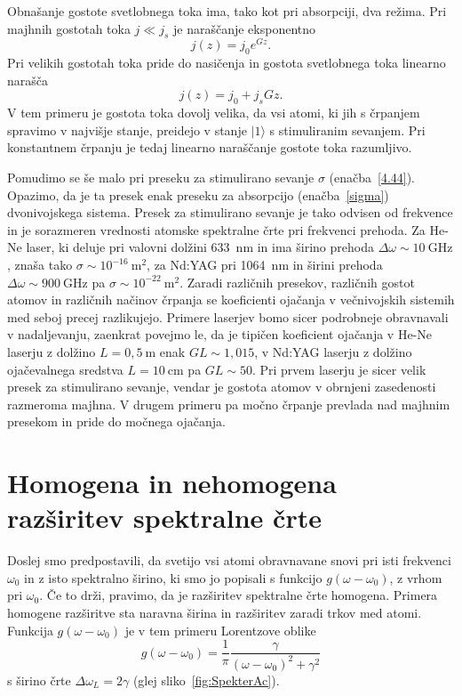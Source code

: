 Obnašanje gostote svetlobnega toka ima, tako kot pri absorpciji, dva režima. 
Pri majhnih gostotah toka $j\ll j_{s}$ je naraščanje eksponentno 
\begin{equation}
j(z)=j_{0}e^{Gz}.
\label{4.45}
\end{equation}
Pri velikih gostotah toka pride do nasičenja in gostota svetlobnega
toka linearno narašča
\begin{equation}
j(z)=j_{0}+j_{s}Gz.
\label{4.46}
\end{equation}
 V tem primeru je gostota toka dovolj velika, da vsi atomi, ki jih
s črpanjem spravimo v najvišje stanje, preidejo v stanje $|1\rangle$
s stimuliranim sevanjem. Pri konstantnem črpanju je tedaj 
linearno naraščanje gostote toka razumljivo. 

Pomudimo se še malo pri preseku za stimulirano sevanje $\sigma$
 (enačba~\ref{4.44}). Opazimo, da je ta presek enak preseku za
absorpcijo (enačba~\ref{sigma}) dvonivojskega sistema. Presek za stimulirano
sevanje je tako odvisen od frekvence in je sorazmeren vrednosti atomske spektralne 
črte pri frekvenci prehoda. Za He-Ne laser, 
ki deluje pri valovni dolžini 633~nm in ima 
širino prehoda $\Delta \omega \sim 10~\si{\giga\hertz}$, znaša tako  $\sigma \sim 10^{-16}~\si{\metre}^2$, 
za Nd:YAG pri 1064~nm in širini prehoda 
$\Delta \omega \sim 900~\si{\giga\hertz}$ pa  $\sigma \sim 10^{-22}~\si{\metre}^2$.
Zaradi različnih presekov, različnih gostot atomov in različnih načinov črpanja se 
koeficienti ojačanja v večnivojskih sistemih med seboj precej razlikujejo. Primere 
laserjev bomo sicer podrobneje obravnavali v nadaljevanju, zaenkrat povejmo 
le, da je tipičen koeficient ojačanja v He-Ne laserju z dolžino $L = 0,5~\si{\metre}$
enak $GL \sim 1,015$, v Nd:YAG laserju z dolžino ojačevalnega sredstva 
$L = 10~\si{\centi\metre}$ pa $GL \sim 50$. Pri prvem laserju je sicer velik presek za stimulirano sevanje, vendar 
je gostota atomov v obrnjeni zasedenosti razmeroma majhna. V drugem primeru pa močno 
črpanje prevlada nad majhnim presekom in pride do močnega ojačanja.

\section{Homogena in nehomogena razširitev spektralne črte}
\label{Razsiritev}
Doslej smo predpostavili, da svetijo vsi atomi obravnavane snovi
pri isti frekvenci $\omega_{0}$ in z isto spektralno širino, ki smo
jo popisali s funkcijo $g(\omega-\omega_0)$, z vrhom pri $\omega_0$. Če to drži, 
pravimo, da je razširitev spektralne črte homogena. 
Primera homogene razširitve sta naravna širina in razširitev zaradi trkov med atomi. 
Funkcija $g(\omega-\omega_0)$ je v tem primeru Lorentzove oblike 
\begin{equation}
g(\omega-\omega_0)=\frac{1}{\pi}\frac{\gamma}{(\omega-\omega_{0})^{2}+\gamma^{2}}
\end{equation}
s širino črte $\Delta \omega_L = 2\gamma$ (glej sliko~\ref{fig:SpekterAc}). 

